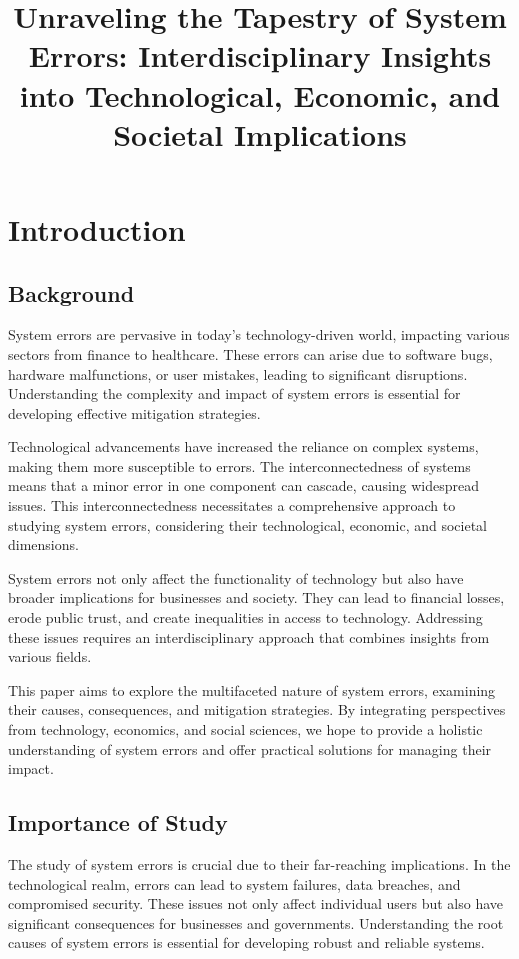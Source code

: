\documentclass[10pt, conference, letterpaper]{IEEEtran}
\title{Unraveling the Tapestry of System Errors: Interdisciplinary Insights into Technological, Economic, and Societal Implications}
\begin{document}
\maketitle

\section{Introduction}
\subsection{Background}
System errors are pervasive in today's technology-driven world, impacting various sectors from finance to healthcare. These errors can arise due to software bugs, hardware malfunctions, or user mistakes, leading to significant disruptions. Understanding the complexity and impact of system errors is essential for developing effective mitigation strategies.

Technological advancements have increased the reliance on complex systems, making them more susceptible to errors. The interconnectedness of systems means that a minor error in one component can cascade, causing widespread issues. This interconnectedness necessitates a comprehensive approach to studying system errors, considering their technological, economic, and societal dimensions.

System errors not only affect the functionality of technology but also have broader implications for businesses and society. They can lead to financial losses, erode public trust, and create inequalities in access to technology. Addressing these issues requires an interdisciplinary approach that combines insights from various fields.

This paper aims to explore the multifaceted nature of system errors, examining their causes, consequences, and mitigation strategies. By integrating perspectives from technology, economics, and social sciences, we hope to provide a holistic understanding of system errors and offer practical solutions for managing their impact.

\subsection{Importance of Study}
The study of system errors is crucial due to their far-reaching implications. In the technological realm, errors can lead to system failures, data breaches, and compromised security. These issues not only affect individual users but also have significant consequences for businesses and governments. Understanding the root causes of system errors is essential for developing robust and reliable systems.
\end{document}
